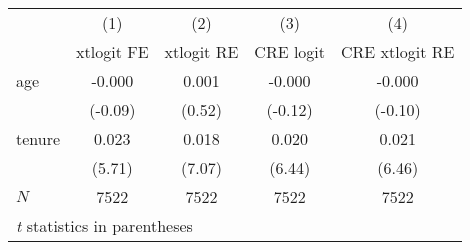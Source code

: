 
\begin{tabular}{l*{4}{c}}
\hline\hline
            &\multicolumn{1}{c}{(1)}&\multicolumn{1}{c}{(2)}&\multicolumn{1}{c}{(3)}&\multicolumn{1}{c}{(4)}\\
            &\multicolumn{1}{c}{xtlogit FE}&\multicolumn{1}{c}{xtlogit RE}&\multicolumn{1}{c}{CRE logit}&\multicolumn{1}{c}{CRE xtlogit RE}\\
\hline
age         &      -0.000&       0.001&      -0.000&      -0.000\\
            &     (-0.09)&      (0.52)&     (-0.12)&     (-0.10)\\
tenure      &       0.023&       0.018&       0.020&       0.021\\
            &      (5.71)&      (7.07)&      (6.44)&      (6.46)\\
\hline
\(N\)       &        7522&        7522&        7522&        7522\\
\hline\hline
\multicolumn{5}{l}{\footnotesize \textit{t} statistics in parentheses}\\
\end{tabular}


